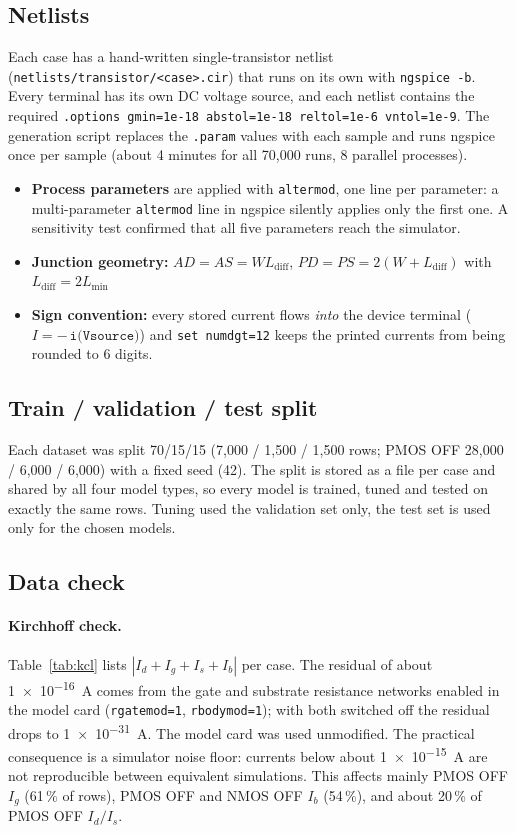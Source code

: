 \documentclass[11pt,a4paper]{article}
\begin{document}
\subsection{Netlists}
Each case has a hand-written single-transistor netlist (\texttt{netlists/transistor/<case>.cir})
that runs on its own with \texttt{ngspice -b}. Every terminal has its own DC voltage source, and
each netlist contains the required
\texttt{.options gmin=1e-18 abstol=1e-18 reltol=1e-6 vntol=1e-9}.
The generation script replaces the \texttt{.param} values with each sample and runs ngspice
once per sample (about 4 minutes for all 70,000 runs, 8 parallel processes).
\begin{itemize}
  \item \textbf{Process parameters} are applied with \texttt{altermod}, one line per parameter:
        a multi-parameter \texttt{altermod} line in ngspice silently applies only the first one.
        A sensitivity test confirmed that all five parameters reach the simulator.
  \item \textbf{Junction geometry:} $AD = AS = W L_{\mathrm{diff}}$, $PD = PS = 2(W + L_{\mathrm{diff}})$ with
        $L_{\mathrm{diff}} = 2L_{\min}$
  \item \textbf{Sign convention:} every stored current flows \emph{into} the device terminal
        ($I = -\,\texttt{i(Vsource)}$) and \texttt{set numdgt=12} keeps the printed currents from being
        rounded to 6 digits.
\end{itemize}

\subsection{Train / validation / test split}
Each dataset was split 70/15/15 (7,000 / 1,500 / 1,500 rows; PMOS OFF 28,000 / 6,000 / 6,000) with a
fixed seed (42). The split
is stored as a file per case and shared by all four model types, so every model is trained,
tuned and tested on exactly the same rows. Tuning used the validation set only, the test set is
used only for the chosen models.

\subsection{Data check}\label{sec:kcl}
\paragraph{Kirchhoff check.} Table~\ref{tab:kcl} lists $|I_d + I_g + I_s + I_b|$ per case.
The residual of about \SI{1e-16}{A} comes from the gate and substrate resistance networks
enabled in the model card (\texttt{rgatemod=1}, \texttt{rbodymod=1}); with both switched off the
residual drops to \SI{1e-31}{A}. The model card was used unmodified. The practical consequence
is a simulator noise floor: currents below about \SI{1e-15}{A} are not reproducible between
equivalent simulations. This affects mainly PMOS OFF $I_g$ (61\,\% of rows), PMOS OFF and NMOS OFF
$I_b$ (54\,\%), and about 20\,\% of PMOS OFF $I_d/I_s$.
\end{document}
